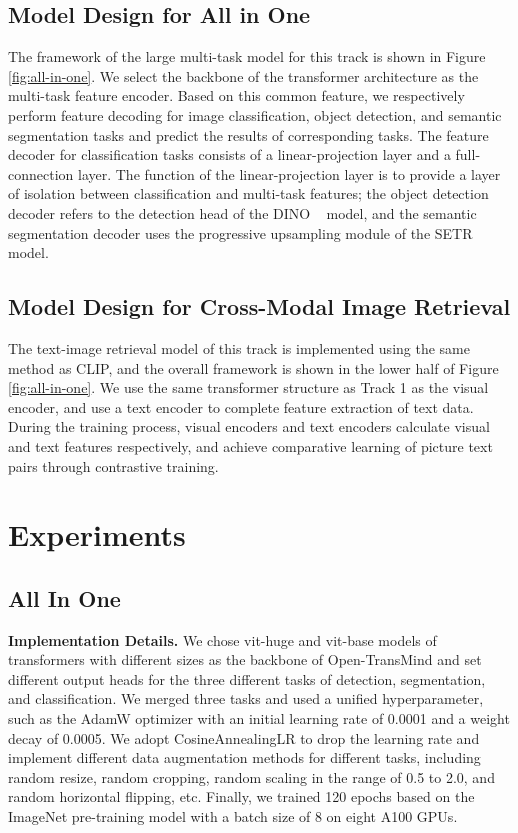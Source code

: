 \documentclass[10pt,twocolumn,letterpaper]{article}
\begin{document}
{\subsection{Model Design for All in One}
The framework of the large multi-task model for this track is shown in Figure \ref{fig:all-in-one}. We select the backbone of the transformer architecture as the multi-task feature encoder. Based on this common feature, we respectively perform feature decoding for image classification, object detection, and semantic segmentation tasks and predict the results of corresponding tasks. The feature decoder for classification tasks consists of a linear-projection layer and a full-connection layer. The function of the linear-projection layer is to provide a layer of isolation between classification and multi-task features; the object detection decoder refers to the detection head of the DINO ~\cite{2022DINO} model, and the semantic segmentation decoder uses the progressive upsampling module of the SETR ~\cite{2021Rethinking} model.

\subsection{Model Design for Cross-Modal Image Retrieval}
The text-image retrieval model of this track is implemented using the same method as CLIP, and the overall framework is shown in the lower half of Figure \ref{fig:all-in-one}. We use the same transformer structure as Track 1 as the visual encoder, and use a text encoder to complete feature extraction of text data. During the training process, visual encoders and text encoders calculate visual and text features respectively, and achieve comparative learning of picture text pairs through contrastive training.

\section{Experiments}
\subsection{All In One}
\textbf{Implementation Details.} We chose vit-huge and vit-base models of transformers with different sizes as the backbone of Open-TransMind and set different output heads for the three different tasks of detection, segmentation, and classification. We merged three tasks and used a unified hyperparameter, such as the AdamW optimizer with an initial learning rate of 0.0001 and a weight decay of 0.0005. We adopt CosineAnnealingLR to drop the learning rate and implement different data augmentation methods for different tasks, including random resize, random cropping, random scaling in the range of 0.5 to 2.0, and random horizontal flipping, etc. Finally, we trained 120 epochs based on the ImageNet pre-training model with a batch size of 8 on eight A100 GPUs.


}
\end{document}
